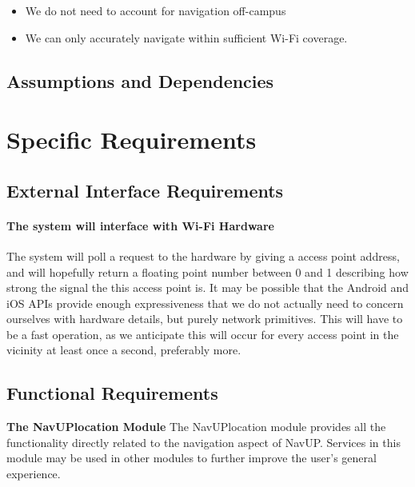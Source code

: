 \documentclass[12pt,a4paper]{article}
\begin{document}
			\begin{itemize}

				\item We do not need to account for navigation off-campus
				\item We can only accurately navigate within sufficient Wi-Fi coverage.

			\end{itemize}

		\subsection{Assumptions and Dependencies}



	\section{Specific Requirements}

		\subsection{External Interface Requirements}

			\paragraph{The system will interface with Wi-Fi Hardware}

				The system will poll a request to the hardware by giving a access point
				address, and will hopefully return a floating point number between 0 and
				 1 describing how strong the signal the this access point is. It may be
				 possible that the Android and iOS APIs provide enough expressiveness
				 that we do not actually need to concern ourselves with hardware
				 details, but purely network primitives. This will have to be a fast
				operation, as we anticipate this will occur for every access point in
				the vicinity at least once a second, preferably more.


		\subsection{Functional Requirements}


			\textbf{The NavUPlocation Module} \newline \newline
			The NavUPlocation module provides all the functionality directly related to the navigation aspect of NavUP. 					Services in this module may be used in other modules to further improve the user's general experience.
\end{document}
